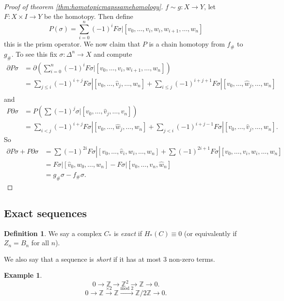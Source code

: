 \documentclass[12pt]{article}
\theoremstyle{definition}
\theoremstyle{definition}
\newtheorem{defn}[thm]{Definition}
\newtheorem{ex}[thm]{Example}
\newcommand{\ZZ}{\mathbb{Z}}
\newcommand{\C}{C_*}
\renewcommand{\H}{H_*}
\begin{document}
\begin{proof}[Proof of theorem \ref{thm:homotopicmapssamehomology}]
$f\sim g\colon X \to Y$, let $F\colon X \times I \to Y$ be the homotopy.
Then define
\[
P(\sigma) = \sum_{i=0}^{n} (-1)^i F\sigma|[v_0,\ldots,v_{i},w_i,w_{i+1},\ldots,w_n]
\]
this is the prism operator.
We now claim that $P$ is a chain homotopy from $f_\#$ to $g_\#$.
To see this fix $\sigma\colon\Delta^n\to X$ and compute
\begin{align*}
\partial P\sigma
&= \partial\left(\sum_{i=0}^{n} (-1)^i F\sigma|[v_0,\ldots,v_{i},w_{i+1},\ldots,w_n]\right)\\
&= \sum_{j \le i} (-1)^{i+j} F\sigma|[v_0,\ldots,\hat{v}_{j},\ldots,w_n] + \sum_{i \le j} (-1)^{i+j+1} F\sigma|[v_0,\ldots,\hat{w}_{j},\ldots,w_n]\\
\end{align*}
and
\begin{align*}
P\partial \sigma 
&= P\left(\sum (-1)^j \sigma|[v_0,\ldots,\hat{v}_j,\ldots,v_n]\right)\\
&= \sum_{i<j} (-1)^{i+j} F\sigma|[v_0,\ldots,\hat{w}_j,\ldots,w_n] + \sum_{j<i} (-1)^{i+j-1} F\sigma|[v_0,\ldots,\hat{v}_j,\ldots,w_n].
\end{align*}
So 
\begin{align*}
\partial P \sigma + P \partial \sigma &= \sum (-1)^{2i} F\sigma |[v_0,\ldots,\hat v_i,w_i,\ldots,w_n] + \sum (-1)^{2i+1} F\sigma |[v_0,\ldots,v_i,\hat w_i,\ldots,w_n]\\
&= F\sigma |[\hat v_0,w_0,\ldots,w_n] - F\sigma | [v_0,\ldots,v_n,\hat w_n] \\
&= g_\# \sigma -  f_\# \sigma.
\end{align*}
\end{proof}

\subsection{Exact sequences}
\begin{defn}
We say a complex $\C$ is \emph{exact} if $\H(C) \equiv 0$ (or equivalently if $Z_n = B_n$ for all $n$).

We also say that a sequence is \emph{short} if it has at most 3 non-zero terms.
\end{defn}

\begin{ex}
\[
0 \to \ZZ \to \ZZ^2 \to \ZZ \to 0.
\]
\[
0 \to \ZZ \xrightarrow{\times 2} \ZZ \xrightarrow{\text{mod }2} \ZZ/2\ZZ \to 0.
\]
\end{ex}
\end{document}
